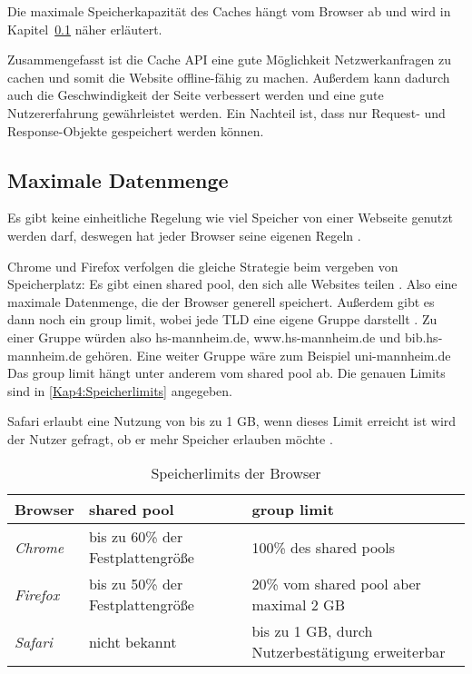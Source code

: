 
Die maximale Speicherkapazität des Caches hängt vom Browser ab und wird in Kapitel~\ref{Kap4:Datenmenge} näher erläutert. 

Zusammengefasst ist die Cache API eine gute Möglichkeit Netzwerkanfragen zu cachen und somit die Website offline-fähig zu machen. Außerdem kann dadurch auch die Geschwindigkeit der Seite verbessert werden und eine gute Nutzererfahrung gewährleistet werden. Ein Nachteil ist, dass nur Request- und Response-Objekte gespeichert werden können. 

\subsection{Maximale Datenmenge}
\label{Kap4:Datenmenge}
Es gibt keine einheitliche Regelung wie viel Speicher von einer Webseite genutzt werden darf, deswegen hat jeder Browser seine eigenen Regeln \autocite{storage-for-the-web}. 

Chrome und Firefox verfolgen die gleiche Strategie beim vergeben von Speicherplatz: Es gibt einen shared pool, den sich alle Websites teilen \autocite{storage-for-the-web} \autocite{mdn-browser-storage-limit}. Also eine maximale Datenmenge, die der Browser generell speichert. Außerdem gibt es dann noch ein group limit, wobei jede \ac{TLD} eine eigene Gruppe darstellt \autocite{mdn-browser-storage-limit}. Zu einer Gruppe würden also hs-mannheim.de, www.hs-mannheim.de und bib.hs-mannheim.de gehören. Eine weiter Gruppe wäre zum Beispiel uni-mannheim.de Das group limit hängt unter anderem vom shared pool ab. Die genauen Limits sind in \autoref{Kap4:Speicherlimits} angegeben.

Safari erlaubt eine Nutzung von bis zu 1 \ac{GB}, wenn dieses Limit erreicht ist wird der Nutzer gefragt, ob er mehr Speicher erlauben möchte \autocite{storage-for-the-web}. 

\begin{table}
\caption{Speicherlimits der Browser}
  \label{Kap4:Speicherlimits}
  \renewcommand{\arraystretch}{1.2}
  \centering
  \sffamily
  \begin{footnotesize}
    \begin{tabular}{l l l}
      \toprule
      \textbf{Browser} & \textbf{shared pool} & \textbf{group limit} \\
      \midrule
      \emph{Chrome} & bis zu 60\% der Festplattengröße & 100\% des shared pools \\
      \emph{Firefox} & bis zu 50\% der Festplattengröße & 20\% vom shared pool aber maximal 2 \ac{GB} \\
      \emph{Safari} & nicht bekannt & bis zu 1 \ac{GB}, durch Nutzerbestätigung erweiterbar \\
      \bottomrule
    \end{tabular}
  \end{footnotesize}
  \rmfamily
\end{table}

